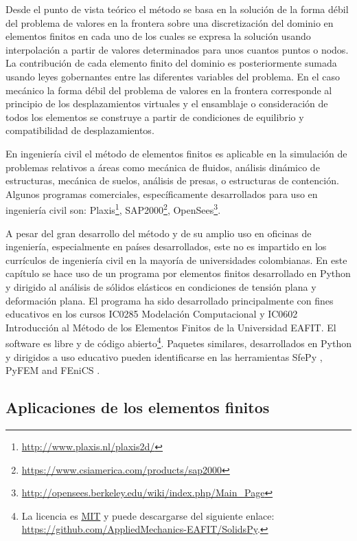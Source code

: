 Desde el punto de vista teórico el método se basa en la solución de la forma 
débil del problema de valores en la frontera sobre una discretización del 
dominio en elementos finitos en cada uno de los cuales se expresa la solución 
usando interpolación a partir de valores determinados para unos cuantos puntos 
o nodos. La contribución de cada elemento finito del dominio es posteriormente 
sumada usando leyes gobernantes entre las diferentes variables del problema. En 
el caso mecánico la forma débil del problema de valores en la frontera 
corresponde al principio de los desplazamientos virtuales y el ensamblaje o 
consideración de todos los elementos se construye a partir de condiciones de 
equilibrio y compatibilidad de desplazamientos. 

En ingeniería civil el método de elementos finitos es aplicable en la 
simulación de problemas relativos a áreas como mecánica de fluidos, análisis 
dinámico de estructuras, mecánica de suelos, análisis de presas, o estructuras 
de contención. Algunos programas comerciales, específicamente desarrollados 
para uso en ingeniería civil son:  
Plaxis\footnote{\url{http://www.plaxis.nl/plaxis2d/}}, 
SAP2000\footnote{\url{https://www.csiamerica.com/products/sap2000}}, 
OpenSees\footnote{\url{http://opensees.berkeley.edu/wiki/index.php/Main_Page}}.

A pesar del gran desarrollo del método y de su amplio uso en oficinas de 
ingeniería, especialmente en países desarrollados, este no es impartido en los 
currículos de ingeniería civil en la mayoría de universidades colombianas. En 
este capítulo se hace uso de un programa por elementos finitos desarrollado en 
Python y dirigido al análisis de sólidos elásticos en condiciones de tensión 
plana y deformación plana. El programa ha sido desarrollado principalmente con 
fines educativos en los cursos IC0285 Modelación Computacional y IC0602 
Introducción al Método de los Elementos Finitos de la Universidad EAFIT. El 
software es libre y de código abierto\footnote{La licencia es 
\href{https://opensource.org/licenses/MIT}{MIT} y puede descargarse del 
siguiente enlace: \url{https://github.com/AppliedMechanics-EAFIT/SolidsPy}.}. 
Paquetes similares, desarrollados en Python y dirigidos a uso educativo pueden 
identificarse en las herramientas SfePy \cite{sfepy}, PyFEM \cite{pyfem} and 
FEniCS \cite{fenics}.

\subsection{Aplicaciones de los elementos finitos}

